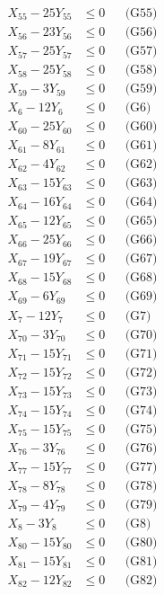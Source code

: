 \documentclass[a4paper,10pt]{article}
\begin{document}
{\begin{align}
\allowbreak
X_{55} - 25Y_{55} &\leq 0 && \text{(G55)} \\
X_{56} - 23Y_{56} &\leq 0 && \text{(G56)} \\
X_{57} - 25Y_{57} &\leq 0 && \text{(G57)} \\
X_{58} - 25Y_{58} &\leq 0 && \text{(G58)} \\
X_{59} - 3Y_{59} &\leq 0 && \text{(G59)} \\
X_{6} - 12Y_{6} &\leq 0 && \text{(G6)} \\
X_{60} - 25Y_{60} &\leq 0 && \text{(G60)} \\
X_{61} - 8Y_{61} &\leq 0 && \text{(G61)} \\
X_{62} - 4Y_{62} &\leq 0 && \text{(G62)} \\
X_{63} - 15Y_{63} &\leq 0 && \text{(G63)} \\
X_{64} - 16Y_{64} &\leq 0 && \text{(G64)} \\
X_{65} - 12Y_{65} &\leq 0 && \text{(G65)} \\
X_{66} - 25Y_{66} &\leq 0 && \text{(G66)} \\
X_{67} - 19Y_{67} &\leq 0 && \text{(G67)} \\
X_{68} - 15Y_{68} &\leq 0 && \text{(G68)} \\
X_{69} - 6Y_{69} &\leq 0 && \text{(G69)} \\
X_{7} - 12Y_{7} &\leq 0 && \text{(G7)} \\
X_{70} - 3Y_{70} &\leq 0 && \text{(G70)} \\
X_{71} - 15Y_{71} &\leq 0 && \text{(G71)} \\
X_{72} - 15Y_{72} &\leq 0 && \text{(G72)} \\
\allowbreak
X_{73} - 15Y_{73} &\leq 0 && \text{(G73)} \\
X_{74} - 15Y_{74} &\leq 0 && \text{(G74)} \\
X_{75} - 15Y_{75} &\leq 0 && \text{(G75)} \\
X_{76} - 3Y_{76} &\leq 0 && \text{(G76)} \\
X_{77} - 15Y_{77} &\leq 0 && \text{(G77)} \\
X_{78} - 8Y_{78} &\leq 0 && \text{(G78)} \\
X_{79} - 4Y_{79} &\leq 0 && \text{(G79)} \\
X_{8} - 3Y_{8} &\leq 0 && \text{(G8)} \\
X_{80} - 15Y_{80} &\leq 0 && \text{(G80)} \\
X_{81} - 15Y_{81} &\leq 0 && \text{(G81)} \\
X_{82} - 12Y_{82} &\leq 0 && \text{(G82)} \\

\end{align}}
\end{document}
